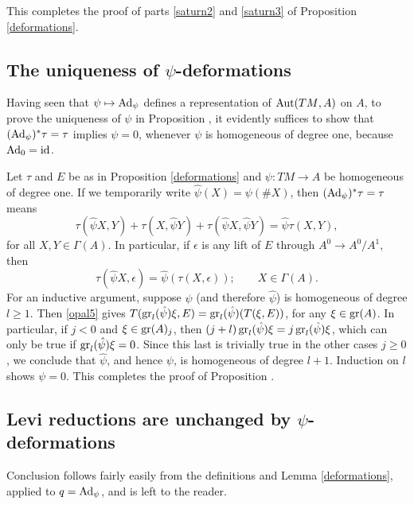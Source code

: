 \documentclass[leqno,12pt]{amsart} %
\begin{document}
This completes the proof of parts \eqref{saturn2} and \eqref{saturn3} of Proposition
\ref{deformations}.

\subsection{The uniqueness of $\psi$-deformations}\label{deformation_uniqueness}
Having seen that $\psi \mapsto \operatorname{Ad}_\psi $ defines a representation of $\operatorname{Aut}({TM},A)$ on
$A$, to prove the uniqueness of $\psi $ in Proposition , it
evidently suffices to show that $(\operatorname{Ad}_\psi)^*\tau = \tau$ implies $\psi = 0$,
whenever $\psi $ is homogeneous of degree one, because $\operatorname{Ad}_0=\mathrm{id}$.

Let $\tau $ and $E$ be as in Proposition \ref{deformations} and
$\psi \colon TM \rightarrow A$ be homogeneous of degree one. If we temporarily write
$\hat \psi(X) = \psi(\#X)$, then $(\operatorname{Ad}_\psi)^*\tau = \tau$ means
\begin{equation*}
  \tau(\hat\psi X, Y) + \tau(X,\hat\psi Y) + \tau(\hat\psi X, \hat\psi Y) = \hat\psi \tau(X, Y),
\end{equation*}
for all $X, Y \in \Gamma(A)$. In particular, if $\epsilon $ is any lift of $E$ through
$A^0 \rightarrow A^0/A^1$, then
\begin{equation}\label{opal5}
  \tau(\hat\psi X, \epsilon) = \hat\psi(\tau(X, \epsilon)); \qquad X \in \Gamma(A).
\end{equation}
For an inductive argument, suppose $\psi $ (and therefore $\hat\psi $) is homogeneous of
degree $l\ge 1$. Then \eqref{opal5} gives
$T(\operatorname{\operatorname{gr}}_l(\hat\psi)\xi, E) = \operatorname{\operatorname{gr}}_l(\hat\psi)(T(\xi, E))$, for any
$\xi \in \operatorname{\operatorname{gr}}(A)$. In particular, if $j < 0$ and $\xi \in \operatorname{\operatorname{gr}}(A)_j$, then
$(j+l) \operatorname{\operatorname{gr}}_l(\hat\psi)\xi = j \operatorname{\operatorname{gr}}_l(\hat\psi)\xi $, which can only be true if
$\operatorname{\operatorname{gr}}_l(\hat\psi)\xi =0$. Since this last is trivially true in the other cases
$j\ge 0$, we conclude that $\hat\psi$, and hence $\psi $, is homogeneous of degree
$l+1$. Induction on $l$ shows $\psi = 0$. This completes the proof of Proposition
.

\subsection{Levi reductions are unchanged by $\psi $-deformations}\label{same_levi}
Conclusion  follows fairly easily from the definitions and
Lemma \ref{deformations}, applied to $q=\operatorname{Ad}_\psi $, and is left to the reader.
\end{document}
